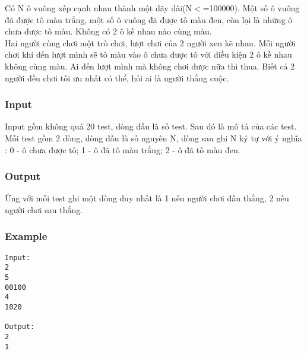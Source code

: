 



   Có N ô vuông xếp cạnh nhau thành một dãy dài(N$<$=100000). Một số ô vuông đã được tô màu trắng, một số ô vuông đã được tô màu đen, còn lại là những ô chưa được tô màu. Không có 2 ô kề nhau nào cùng màu.   
\\   Hai người cùng chơi một trò chơi, lượt chơi của 2 người xen kẽ nhau. Mỗi người chơi khi đến lượt mình sẽ tô màu vào ô chưa được tô với điều kiện 2 ô kề nhau không cùng màu. Ai đến lượt mình mà không chơi được nữa thì thua. Biết cả 2 người đều chơi tối ưu nhất có thể, hỏi ai là người thắng cuộc.  

\subsubsection{   Input  }

   Input gồm không quá 20 test, dòng đầu là số test. Sau đó là mô tả của các test.   
\\   Mỗi test gồm 2 dòng, dòng đầu là số nguyên N, dòng sau ghi N ký tự với ý nghĩa : 0 - ô chưa được tô; 1 - ô đã tô màu trắng; 2 - ô đã tô màu đen.  

\subsubsection{   Output  }

   Ứng với mỗi test ghi một dòng duy nhất là 1 nếu người chơi đầu thắng, 2 nếu người chơi sau thắng.  

\subsubsection{   Example  }
\begin{verbatim}
Input:
2
5
00100
4
1020

Output:
2
1
\end{verbatim}